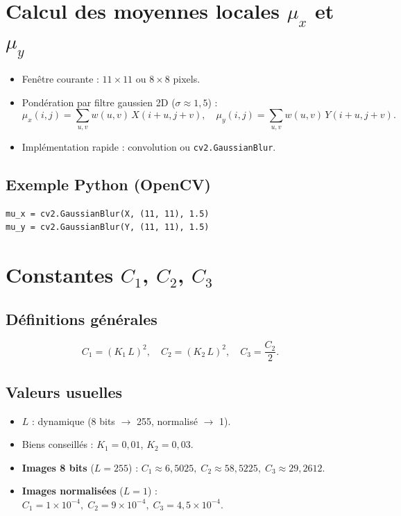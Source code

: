 \documentclass[a4paper,12pt]{report}
\begin{document}
\section{Calcul des moyennes locales $\mu_x$ et $\mu_y$}

\begin{itemize}
  \item Fenêtre courante : $11 \times 11$ ou $8 \times 8$ pixels.
  \item Pondération par filtre gaussien 2D ($\sigma \approx 1{,}5$) :
    \[
      \mu_x(i,j) = \sum_{u,v}w(u,v)\,X(i+u,j+v),\quad
      \mu_y(i,j) = \sum_{u,v}w(u,v)\,Y(i+u,j+v).
    \]
  \item Implémentation rapide : convolution ou \texttt{cv2.GaussianBlur}.
\end{itemize}

\subsection*{Exemple Python (OpenCV)}

\begin{verbatim}
mu_x = cv2.GaussianBlur(X, (11, 11), 1.5)
mu_y = cv2.GaussianBlur(Y, (11, 11), 1.5)
\end{verbatim}

\section{Constantes $C_1$, $C_2$, $C_3$}

\subsection*{Définitions générales}

\[
  C_1 = (K_1\,L)^2,\quad
  C_2 = (K_2\,L)^2,\quad
  C_3 = \frac{C_2}{2}.
\]

\subsection*{Valeurs usuelles}

\begin{itemize}
  \item $L$ : dynamique (8 bits $\to$ 255, normalisé $\to$ 1).
  \item Biens conseillés : $K_1=0{,}01$, $K_2=0{,}03$.
  \item \textbf{Images 8 bits} ($L=255$) :  
    $C_1\approx6{,}5025,\;C_2\approx58{,}5225,\;C_3\approx29{,}2612$.
  \item \textbf{Images normalisées} ($L=1$) :  
    $C_1=1\times10^{-4},\;C_2=9\times10^{-4},\;C_3=4{,}5\times10^{-4}$.
\end{itemize}
\end{document}
